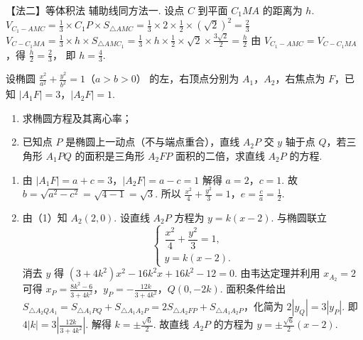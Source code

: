 \begin{solution}
\begin{enumerate}
【法二】等体积法
辅助线同方法一.
设点 \(C\) 到平面 \(C_1MA\) 的距离为 \(h\).
\(V_{C_1-AMC}=\frac{1}{3}\times C_1P\times S_{\triangle AMC}=\frac{1}{3}\times 2\times \frac{1}{2}\times \left( \sqrt2 \right)^2=\frac{2}{3}\)
\(V_{C-C_1MA}=\frac{1}{3}\times h\times S_{\triangle AMC_1}=\frac{1}{3}\times h\times \frac{1}{2}\times \sqrt2\times \frac{3\sqrt2}{2}=\frac{h}{2}\)
由 \(V_{C_1-AMC}=V_{C-C_1MA}\)，得
\(\frac{h}{2}=\frac{2}{3}\)，
即
\(h=\frac{4}{3}\).
\end{enumerate}
\end{solution}

\begin{problem}
设椭圆 \(\frac{x^2}{a^2}+\frac{y^2}{b^2}=1\)（\(a>b>0\)） 的左，右顶点分别为 \(A_1\)，\(A_2\)，右焦点为 \(F\)，已知 \(|A_1F|=3\)，\(|A_2F|=1\).

\begin{enumerate}
\item 求椭圆方程及其离心率；
\item 已知点 \(P\) 是椭圆上一动点（不与端点重合），直线 \(A_2P\) 交 \(y\) 轴于点 \(Q\)，若三角形 \(A_1PQ\) 的面积是三角形 \(A_2FP\) 面积的二倍，求直线 \(A_2P\) 的方程.
\end{enumerate}
\end{problem}

\begin{solution}
\begin{enumerate}
\item 由 \(|A_1F|=a+c=3\)，\(|A_2F|=a-c=1\) 解得
\(a=2\)，\(c=1\).
故 \(b=\sqrt{a^2-c^2}=\sqrt{4-1}=\sqrt3\). 所以
\(\frac{x^2}{4}+\frac{y^2}{3}=1\)，\(e=\frac{c}{a}=\frac{1}{2}\).

\item 由（1）知 \(A_2(2,0)\). 设直线 \(A_2P\) 方程为 \(y=k(x-2)\). 与椭圆联立
\[
\begin{cases}
\dfrac{x^2}{4}+\dfrac{y^2}{3}=1,\\
y=k(x-2).
\end{cases}
\]
消去 \(y\) 得 \((3+4k^2)x^2-16k^2x+16k^2-12=0\).
由韦达定理并利用 \(x_{A_2}=2\) 可得
\(x_P=\frac{8k^2-6}{3+4k^2}\)，\(y_P=-\frac{12k}{3+4k^2}\)，\(Q(0,-2k)\).
面积条件给出 \(S_{\triangle A_2QA_1}=S_{\triangle A_1PQ}+S_{\triangle A_1A_2P}=2S_{\triangle A_2FP}+S_{\triangle A_1A_2P}\)，化简为 \(2|y_Q|=3|y_P|\).
即
\(4|k|=3\left| \frac{12k}{3+4k^2} \right|\).
解得 \(k=\pm \frac{\sqrt6}{2}\). 故直线 \(A_2P\) 的方程为 \(y=\pm \frac{\sqrt6}{2}(x-2)\).
\end{enumerate}
\end{solution}

